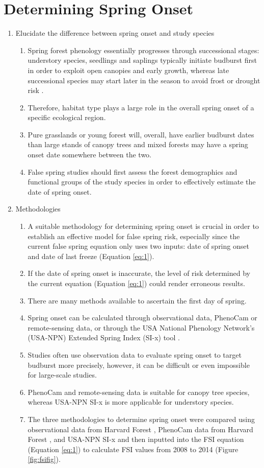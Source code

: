 \documentclass{article}\usepackage[]{graphicx}\usepackage[]{color}
\begin{document}
\section*{Determining Spring Onset}
\begin{enumerate}
\item Elucidate the difference between spring onset and study species
\begin{enumerate}
\item Spring forest phenology essentially progresses through successional stages: understory species, seedlings and saplings typically initiate budburst first in order to exploit open canopies and early growth, whereas late successional species may start later in the season to avoid frost or drought risk \citep{Richardson2009, Xin2016}.
\item Therefore, habitat type plays a large role in the overall spring onset of a specific ecological region. 
\item Pure grasslands or young forest will, overall, have earlier budburst dates than large stands of canopy trees and mixed forests may have a spring onset date somewhere between the two.
\item False spring studies should first assess the forest demographics and functional groups of the study species in order to effectively estimate the date of spring onset.
\end{enumerate}
\item Methodologies
\begin{enumerate}
\item A suitable methodology for determining spring onset is crucial in order to establish an effective model for false spring risk, especially since the current false spring equation only uses two inputs: date of spring onset and date of last freeze (Equation \ref{eq:1}). 
\item If the date of spring onset is inaccurate, the level of risk determined by the current equation (Equation \ref{eq:1}) could render erroneous results. 
\item There are many methods available to ascertain the first day of spring.
\item Spring onset can be calculated through observational data, PhenoCam or remote-sensing data, or through the USA National Phenology Network's (USA-NPN) Extended Spring Index (SI-x) tool \citep{USA-NPN2016}.
\item Studies often use observation data to evaluate spring onset to target budburst more precisely, however, it can be difficult or even impossible for large-scale studies. 
\item PhenoCam and remote-sensing data is suitable for canopy tree species, whereas USA-NPN SI-x is more applicable for understory species. 
\item The three methodologies to determine spring onset were compared using observational data from Harvard Forest \citep{Okeefe2014}, PhenoCam data from Harvard Forest \citep{Richardson2015}, and USA-NPN SI-x \citep{USA-NPN2016} and then inputted into the FSI equation (Equation \ref{eq:1}) to calculate FSI values from 2008 to 2014 (Figure \ref{fig:fsifig}).



\end{enumerate}
\end{enumerate}
\end{document}
